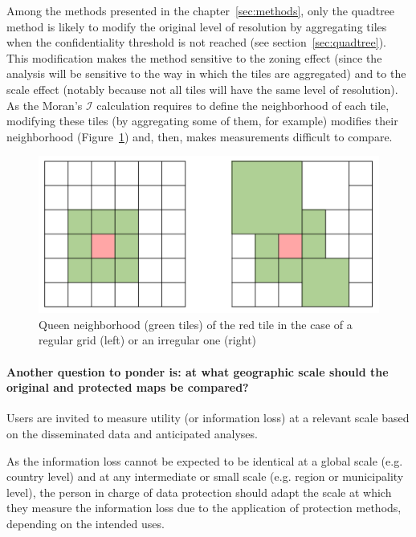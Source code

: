 Among the methods presented in the chapter~\ref{sec:methods}, only the quadtree method is likely to modify the original level of resolution by aggregating tiles when the confidentiality threshold is not reached (see section~\ref{sec:quadtree}). This modification makes the method sensitive to the zoning effect (since the analysis will be sensitive to the way in which the tiles are aggregated) and to the scale effect (notably because not all tiles will have the same level of resolution). As the Moran’s $\mathcal{I}$ calculation requires to define the neighborhood of each tile, modifying these tiles (by aggregating some of them, for example) modifies their neighborhood (Figure~\ref{fig:queen_neigh}) and, then, makes measurements difficult to compare.

\begin{figure}
    \centering
    \includegraphics[width=0.75\linewidth]{figures/queen_neighborhood.png}
    \caption{Queen neighborhood (green tiles) of the red tile in the case of a regular grid (left) or an irregular one (right)}
    \label{fig:queen_neigh}
\end{figure}

\paragraph{Another question to ponder is: at what geographic scale should the original and protected maps be compared?}

Users are invited to measure utility (or information loss) at a relevant scale based on the disseminated data and anticipated analyses.

As the information loss cannot be expected to be identical at a global scale (e.g. country level) and at any intermediate or small scale (e.g. region or municipality level), the person in charge of data protection should adapt the scale at which they measure the information loss due to the application of protection methods, depending on the intended uses.


